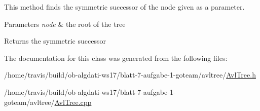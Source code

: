 This method finds the symmetric successor of the node given as a parameter.


\begin{DoxyParams}{Parameters}
{\em node} & the root of the tree \\
\hline
\end{DoxyParams}
\begin{DoxyReturn}{Returns}
the symmetric successor 
\end{DoxyReturn}


The documentation for this class was generated from the following files\-:\begin{DoxyCompactItemize}
\item 
/home/travis/build/ob-\/algdati-\/ws17/blatt-\/7-\/aufgabe-\/1-\/goteam/avltree/\hyperlink{AvlTree_8h}{Avl\-Tree.\-h}\item 
/home/travis/build/ob-\/algdati-\/ws17/blatt-\/7-\/aufgabe-\/1-\/goteam/avltree/\hyperlink{AvlTree_8cpp}{Avl\-Tree.\-cpp}\end{DoxyCompactItemize}
